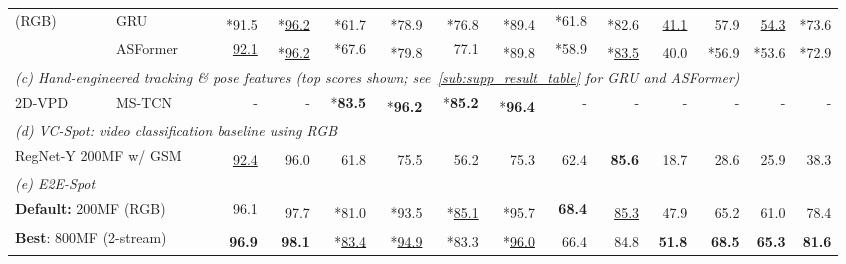 \documentclass[runningheads]{llncs}
\newcommand{\OURMETHOD}{{E2E-Spot}\xspace}
\newcommand{\best}[1]{\underline{#1}}
\newcommand{\sota}[1]{\textbf{#1}}
\newcommand{\nms}{\textsuperscript{\textdagger}}
\newcommand{\loss}{*}
\begin{document}
\begin{table*}[t]
{\begin{tabularx}{\textwidth}{ll
        rr
        rr
        rr
        rr
        rr
        rr
    }
        (RGB)
        & GRU
            & \nms \loss 91.5 & \nms \loss \best{96.2}
            & \nms \loss 61.7 & \nms \loss 78.9
            & \nms \loss 76.8 & \nms \loss 89.4
            & \loss 61.8 & \nms \loss 82.6
            & \nms \best{41.1} & \nms 57.9
            & \nms \best{54.3} & \nms \loss 73.6
            \\

        & ASFormer
            & \best{92.1} & \nms\loss \best{96.2}
            & \loss 67.6 & \nms\loss 79.8
            & 77.1 & \nms\loss 89.8
            & \loss 58.9 & \nms\loss \best{83.5}
            & \nms 40.0 & \nms\loss 56.9
            & \nms\loss 53.6 & \nms\loss 72.9
            \\
        \midrule
        \multicolumn{12}{l}{\em (c) Hand-engineered tracking \& pose features (top scores shown; see~\autoref{sub:supp_result_table} for GRU and ASFormer)} \\
        2D-VPD~\cite{vpd}
        & MS-TCN
            & - & -
            & \loss \sota{83.5} & \nms \loss \sota{96.2}
            & \loss \sota{85.2} & \nms \loss \sota{96.4}
            & - & -
            & - & -
            & - & -
            \\

        \midrule
        \multicolumn{12}{l}{\em (d) VC-Spot: video classification baseline using RGB} \\
        \multicolumn{2}{l}{RegNet-Y 200MF w/ GSM}
            & \nms \best{92.4} & \nms 96.0
            & \nms 61.8 & \nms 75.5
            & \nms 56.2 & \nms 75.3
            & \nms 62.4 & \nms \sota{85.6}
            & \nms 18.7 & \nms 28.6
            & \nms 25.9 & \nms 38.3
            \\

        \midrule
        \multicolumn{12}{l}{\em (e) \OURMETHOD}\\
        \multicolumn{2}{l}{{\bf Default:} 200MF (RGB)}
            & 96.1 & \nms 97.7
            & \nms \loss 81.0 & \nms \loss 93.5 & \nms \loss\best{85.1} & \nms \loss 95.7 & \sota{68.4} & \nms \best{85.3}
            & \nms 47.9 & \nms 65.2
            & \nms 61.0 & \nms 78.4
            \\
        \multicolumn{2}{l}{{\bf Best}: 800MF (2-stream)}
            & \nms \sota{96.9} & \nms \sota{98.1}
            & \nms \loss \best{83.4} & \nms \loss \best{94.9} & \nms \loss 83.3 & \nms \loss \best{96.0} & \nms 66.4 & \nms 84.8
            & \nms \sota{51.8} & \nms \sota{68.5}
            & \nms \sota{65.3} & \nms \sota{81.6}
            \\

        \bottomrule
    \end{tabularx}
    }
\end{table*} \newcommand{\tabindent}[0]{\,\,\,\,}
\end{document}
